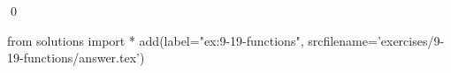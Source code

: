 
\begin{ex}
  \label{ex:9-19-functions}
  
  \qed
\end{ex}
\begin{python0}
from solutions import *
add(label="ex:9-19-functions",
    srcfilename='exercises/9-19-functions/answer.tex')
\end{python0}
